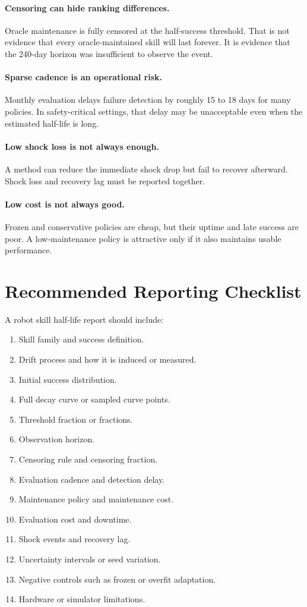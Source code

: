 \documentclass{article}
\begin{document}
\paragraph{Censoring can hide ranking differences.}
Oracle maintenance is fully censored at the half-success threshold. That is not
evidence that every oracle-maintained skill will last forever. It is evidence
that the 240-day horizon was insufficient to observe the event.

\paragraph{Sparse cadence is an operational risk.}
Monthly evaluation delays failure detection by roughly 15 to 18 days for many
policies. In safety-critical settings, that delay may be unacceptable even when
the estimated half-life is long.

\paragraph{Low shock loss is not always enough.}
A method can reduce the immediate shock drop but fail to recover afterward.
Shock loss and recovery lag must be reported together.

\paragraph{Low cost is not always good.}
Frozen and conservative policies are cheap, but their uptime and late success
are poor. A low-maintenance policy is attractive only if it also maintains
usable performance.

\section{Recommended Reporting Checklist}

A robot skill half-life report should include:
\begin{enumerate}
    \item Skill family and success definition.
    \item Drift process and how it is induced or measured.
    \item Initial success distribution.
    \item Full decay curve or sampled curve points.
    \item Threshold fraction or fractions.
    \item Observation horizon.
    \item Censoring rule and censoring fraction.
    \item Evaluation cadence and detection delay.
    \item Maintenance policy and maintenance cost.
    \item Evaluation cost and downtime.
    \item Shock events and recovery lag.
    \item Uncertainty intervals or seed variation.
    \item Negative controls such as frozen or overfit adaptation.
    \item Hardware or simulator limitations.
\end{enumerate}
\end{document}
